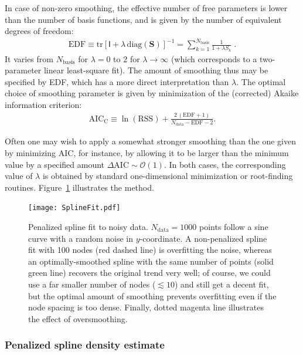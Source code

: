 \documentclass[12pt]{article}
\begin{document}
In case of non-zero smoothing, the effective number of free parameters is lower than the number of basis functions, and is given by the number of equivalent degrees of freedom:
\begin{align}
\mathrm{EDF} \equiv \mathrm{tr}[\mathsf{I} + \lambda\,\mathrm{diag}(\boldsymbol{S})]^{-1} =
\sum_{k=1}^{N_\mathrm{basis}} \frac{1}{1+\lambda S_k} \;.
\end{align}
It varies from $N_\mathrm{basis}$ for $\lambda=0$ to 2 for $\lambda\to\infty$ (which corresponds to a two-parameter linear least-square fit). The amount of smoothing thus may be specified by EDF, which has a more direct interpretation than $\lambda$. The optimal choice of smoothing parameter is given by minimization of the (corrected) Akaike information criterion:
\begin{align}
\mathrm{AIC_C} \equiv \ln(\mathrm{RSS}) + \frac{2\,(\mathrm{EDF}+1)}{N_\mathrm{data}-\mathrm{EDF}-2}.
\end{align}

Often one may wish to apply a somewhat stronger smoothing than the one given by minimizing AIC, for instance, by allowing it to be larger than the minimum value by a specified amount $\Delta\mathrm{AIC}\sim \mathcal{O}(1)$. In both cases, the corresponding value of $\lambda$ is  obtained by standard one-dimensional minimization or root-finding routines. Figure~\ref{fig:SplineFit} illustrates the method.

\begin{figure}[t]
\begin{center}
\texttt{[image: SplineFit.pdf]}
\end{center}
\caption{Penalized spline fit to noisy data. $N_\mathrm{data}=1000$ points follow a sine curve with a random noise in $y$-coordinate. A non-penalized spline fit with 100 nodes (red dashed line) is overfitting the noise, whereas an optimally-smoothed spline with the same number of points (solid green line) recovers the original trend very well; of course, we could use a far smaller number of nodes ($\lesssim 10$) and still get a decent fit, but the optimal amount of smoothing prevents overfitting even if the node spacing is too dense. Finally, dotted magenta line illustrates the effect of oversmoothing.
} \label{fig:SplineFit}
\end{figure}

\subsubsection{Penalized spline density estimate}  \label{sec:MathSplineDensityDetails}
\end{document}
